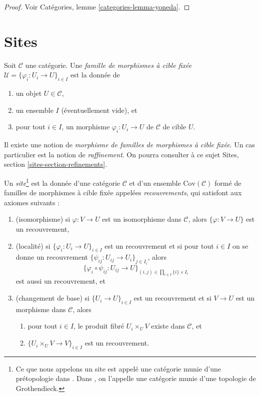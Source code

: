 \begin{proof}
Voir
Cat\'egories, lemme \ref{categories-lemma-yoneda}.
\end{proof}




\section{Sites}
\label{section-sites}


\begin{definition}
\label{definition-family-morphisms-fixed-target}
Soit $\mathcal{C}$ une cat\'egorie. Une {\it famille de morphismes \`a cible fix\'ee}
$\mathcal{U} = \{\varphi_i : U_i \to U\}_{i\in I}$ est la donn\'ee de
\begin{enumerate}
\item un objet $U \in \mathcal{C}$,
\item un ensemble $I$ (\'eventuellement vide), et
\item pour tout $i\in I$, un morphisme $\varphi_i : U_i \to U$ de $\mathcal{C}$
de cible $U$.
\end{enumerate}
\end{definition}

\noindent
Il existe une notion de {\it morphisme de familles de morphismes \`a cible
fix\'ee}. Un cas particulier est la notion de {\it raffinement}.
On pourra consulter \`a ce sujet
Sites, section \ref{sites-section-refinements}.

\begin{definition}
\label{definition-site}
Un {\it site}\footnote{Ce que nous appelons un site est appel\'e une cat\'egorie munie d'une
pr\'etopologie dans \cite[Expos\'e II, D\'efinition 1.3]{SGA4}.
Dans \cite{ArtinTopologies}, on l'appelle une cat\'egorie munie d'une topologie de
Grothendieck.} est la donn\'ee d'une cat\'egorie $\mathcal{C}$ et d'un ensemble
$\text{Cov}(\mathcal{C})$ form\'e de familles de morphismes \`a cible fix\'ee
appel\'ees {\it recouvrements}, qui satisfont aux axiomes suivants :
\begin{enumerate}
\item (isomorphisme) si $\varphi : V \to U$ est un isomorphisme dans $\mathcal{C}$,
alors $\{\varphi : V \to U\}$ est un recouvrement,
\item (localit\'e) si $\{\varphi_i : U_i \to U\}_{i\in I}$ est un recouvrement et si
pour tout $i \in I$ on se donne un recouvrement
$\{\psi_{ij} : U_{ij} \to U_i \}_{j\in I_i}$, alors
$$
\{
\varphi_i \circ \psi_{ij} : U_{ij} \to U
\}_{(i, j)\in \prod_{i\in I} \{i\} \times I_i}
$$
est aussi un recouvrement, et
\item (changement de base) si $\{U_i \to U\}_{i\in I}$
est un recouvrement et si $V \to U$ est un morphisme dans $\mathcal{C}$, alors
\begin{enumerate}
\item pour tout $i \in I$, le produit fibr\'e
$U_i \times_U V$ existe dans $\mathcal{C}$, et
\item $\{U_i \times_U V \to V\}_{i\in I}$ est un recouvrement.
\end{enumerate}
\end{enumerate}
\end{definition}

